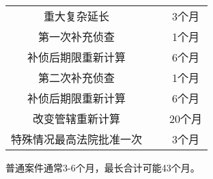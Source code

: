\documentclass[
    a4paper
    ]{ctexart}
\begin{document}
\begin{sloppy}
{\begin{center}
\begin{tabular}{|c|c|c|}
                
                \cline{1-1}
                \cline{3-3}
                重大复杂延长 & ~ & 3个月 \\
                \cline{1-1}
                \cline{3-3}
                第一次补充侦查 & ~ & 1个月 \\
                \cline{1-1}
                \cline{3-3}
                补侦后期限重新计算 & ~  & 6个月\\
                \cline{1-1}
                \cline{3-3}
                第二次补充侦查 & ~ & 1个月 \\
                \cline{1-1}
                \cline{3-3}
                补侦后期限重新计算 & ~ & 6个月 \\
                \cline{1-1}
                \cline{3-3}
                改变管辖重新计算 & ~ & 20个月\\
                \cline{1-1}
                \cline{3-3}
                特殊情况最高法院批准一次 & ~ & 3个月\\
                \hline
            \end{tabular}
        \end{center}

        \vspace{1em}
        普通案件通常3-6个月，最长合计可能43个月。

    }

\end{sloppy}
\end{document}

